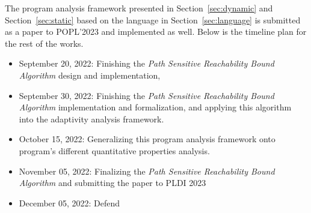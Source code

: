 The program analysis framework presented in Section~\ref{sec:dynamic} and Section~\ref{sec:static} 
based on the language in Section~\ref{sec:language}
 is submitted as a paper to POPL'2023 and implemented as well. 
 Below is the timeline plan for
 the rest of the works.
\begin{itemize}
\item September 20, 2022:
Finishing the \emph{Path Sensitive Reachability Bound Algorithm} design and implementation, 
\item September 30, 2022: Finishing the \emph{Path Sensitive Reachability Bound Algorithm} implementation and formalization, 
and applying this algorithm into the adaptivity analysis framework.
\item October 15, 2022:  Generalizing this program analysis framework onto program's different quantitative properties analysis.
\item November 05, 2022: Finalizing the \emph{Path Sensitive Reachability Bound Algorithm} and submitting the paper to PLDI 2023
\item December 05, 2022: Defend
\end{itemize}

